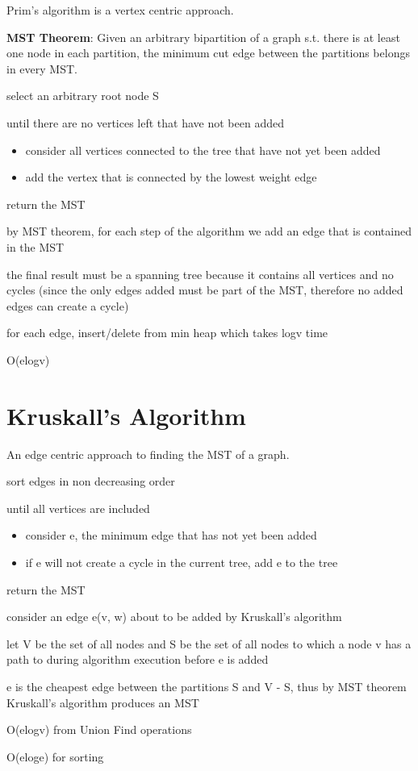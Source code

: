 Prim's algorithm is a vertex centric approach.
 
\textbf{MST Theorem}: Given an arbitrary bipartition of a graph s.t. there is at least one node in each partition, the minimum cut edge between the partitions belongs in every MST.

\algorithm
{
    \item select an arbitrary root node S
    \item until there are no vertices left that have not been added
    \begin{itemize}
        \item consider all vertices connected to the tree that have not yet been added
        \item add the vertex that is connected by the lowest weight edge
    \end{itemize}
    \item return the MST
}
{
    \item by MST theorem, for each step of the algorithm we add an edge that is contained in the MST
    \item the final result must be a spanning tree because it contains all vertices and no cycles (since the only edges added must be part of the MST, therefore no added edges can create a cycle)
    
}
{
    \item for each edge, insert/delete from min heap which takes logv time
    \item O(elogv)
}


\section{Kruskall's Algorithm}
An edge centric approach to finding the MST of a graph.

\algorithm
{
    \item sort edges in non decreasing order
    \item until all vertices are included
    \begin{itemize}
        \item consider e, the minimum edge that has not yet been added
        \item if e will not create a cycle in the current tree, add e to the tree
    \end{itemize}
    \item return the MST
}
{
    \item consider an edge e(v, w) about to be added by Kruskall's algorithm
    \item let V be the set of all nodes and S be the set of all nodes to which a node v has a path to during algorithm execution before e is added
    \item e is the cheapest edge between the partitions S and V - S, thus by MST theorem Kruskall's algorithm produces an MST
    
}
{
    \item O(elogv) from Union Find operations
    \item O(eloge) for sorting
    
}


